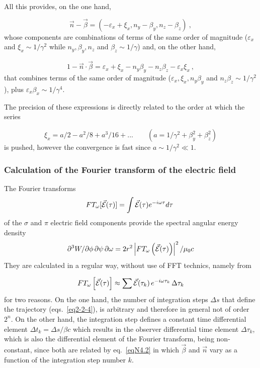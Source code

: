 \noindent All this provides, on the one hand, 

\begin{equation}
\vec{n} - \vec{\beta} = (-\varepsilon_x + \xi_x, n_y - \beta_y, n_z - \beta_z)~,  \label{eqN4.8}
\end{equation}   %
%
whose components are combinations of terms of the same order of magnitude
($\varepsilon_x$ and $\xi_x \sim 1/\gamma^2$ while $n_y, \beta_y, n_z$ and $\beta_z \sim
1/\gamma$) and, on the other hand,

\begin{equation}
1 - \vec{n} \cdot \vec{\beta} = \varepsilon_x + \xi_x - n_y\beta_y - n_z\beta_z -  \label{eqN4.9}
\varepsilon_x\xi_x~,
\end{equation}  %
%
that combines terms of the same order of magnitude ($\varepsilon_x, \xi_x, n_y\beta_y$
and $n_z\beta_z \sim 1/\gamma^2$), plus $\varepsilon_x\beta_x \sim 1/\gamma^4$.

\noindent The precision of these expressions is
directly related to the order at which the series

$$
	\xi_x = a/2 - a^2/8 + a^3/16 +... \qquad(a = 1/\gamma^2 + \beta_y^2 +\beta^2_z)
	$$
is pushed, however the convergence is   fast since $ a \sim 1/\gamma^2 \ll 1$.

\subsubsection{Calculation of the Fourier transform of the electric field}\label{secN4.2}

The Fourier transforms
$$
	FT_\omega  [ \vec {\mathcal{E}} (\tau)] = \int \vec {\mathcal{E}}  (\tau) e^{-i\omega\tau} d\tau~$$
of the $\sigma$ and $\pi$ electric field components provide the spectral angular
 energy density 
\begin{equation}
	\partial^3 W/\partial\phi\, \partial\psi\, \partial\omega 
		= 2 r^2 \left| FT_\omega \left(\vec  {\mathcal{E}} (\tau) \right)  \label{eqN4.10}
		\right|^2 / \mu_0 c
\end{equation}  %
%
They are calculated in a regular way, without use of FFT technics, namely from 

\begin{equation}
	FT_\omega \left[ \vec {\mathcal{E}}  (\tau) \right] 
		\approx \sum \vec {\mathcal{E}} (\tau_k)\, e^{-i\omega\tau_k} \, \Delta\tau_k  \label{eqN4.11}
\end{equation}    %
%
for two reasons. On the one hand, the number of integration steps $\Delta s$ that define the
trajectory (eqs.~\ref{eq2-2-4}), is arbitrary and therefore in general not of order $2^n$.
On the other hand, the integration step defines a constant time differential element 
$\Delta t_k = \Delta s/ \beta c$ which results in the observer differential time 
element $ \Delta \tau_k$, which is
also the differential element of the Fourier transform, being non-constant, since both
are related by eq.~\ref{eqN4.2} in which $\vec{\beta}$ and $\vec{n}$ 
vary as a function of the  integration step number $k$.

